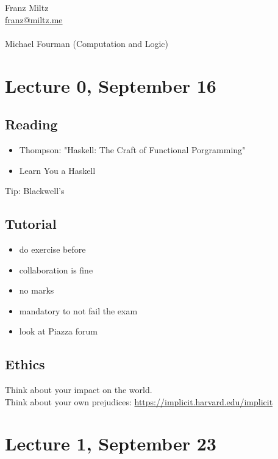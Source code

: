 \documentclass{article}
\theoremstyle{sltheorem}
\begin{document}
\begin{titlepage}
    \begin{center}
        
        \LARGE Franz Miltz\\
        \url{franz@miltz.me}\\
        \vspace{5cm}
        \LARGE{}\\
        \vspace{1cm}
        Michael Fourman (Computation and Logic)
    \end{center}
\end{titlepage}
\tableofcontents
\pagebreak
\section{Lecture 0, September 16}
\subsection{Reading}
\begin{itemize}
    \item Thompson: "Haskell: The Craft of Functional Porgramming"
    \item Learn You a Haskell
\end{itemize}
Tip: Blackwell's\\
\subsection{Tutorial}
\begin{itemize}
    \item do exercise before
    \item collaboration is fine
    \item no marks
    \item mandatory to not fail the exam
\end{itemize}
\begin{itemize}
    \item look at Piazza forum
\end{itemize}
\subsection{Ethics}
Think about your impact on the world.\\
Think about your own prejudices:
\url{https://implicit.harvard.edu/implicit}
\section{Lecture 1, September 23}
\end{document}

